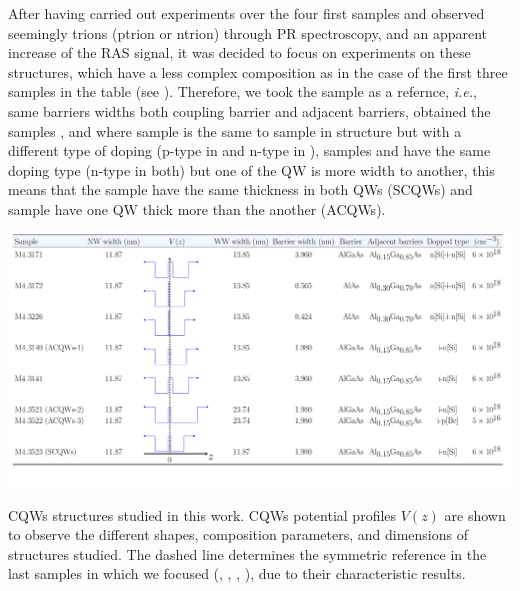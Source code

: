 After having carried out experiments over the four first samples and observed seemingly trions (\gls{ptrion} or \gls{ntrion}) through \gls{PR} spectroscopy, and an apparent increase of the \gls{RAS} signal, it was decided
to focus on experiments on these structures, which have a less complex composition as
in the case of the first three samples in the table (see ). Therefore, we took the sample  as a refernce, \textit{i.e.}, same barriers widths both coupling barrier and adjacent
barriers, obtained the samples ,  and  where sample 
is the same to sample  in structure but with a different type of doping (p-type in
 and n-type in ), samples  and  have the same doping
type (n-type in both) but one of the QW is more width to another, this means that the
sample  have the same thickness in both QWs (SCQWs) and sample 
have one \gls{QW} thick more than the another (\gls{ACQWs}).
\begin{landscape}
	\begin{table}
		\centering
		\includegraphics[width=\textwidth]{../tables/chapter-3/table-1-samples/build-ruco/table-1-samples.pdf}
		\caption[Table of samples description]{CQWs structures studied in this work.  CQWs potential profiles $V(z)$ are shown to observe the different shapes, composition parameters, and dimensions of structures studied. The dashed line determines the symmetric reference in the last samples in which we focused (\tucu, \tcvu, \tcvd, \tcvt), due to their characteristic results. }
		\label{tab:chapter3:Samples description} 
	\end{table}
\end{landscape}
